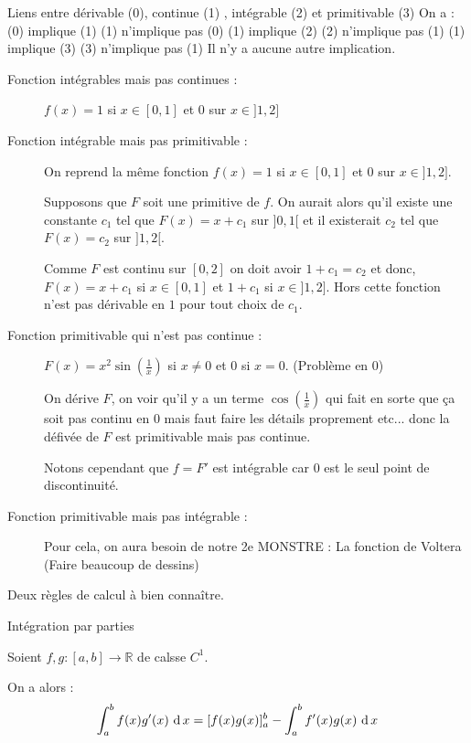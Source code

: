 Liens entre dérivable (0), continue (1) , intégrable (2) et primitivable (3)
On a :
(0) implique (1)
(1) n'implique pas (0)
(1) implique (2)
(2) n'implique pas (1)
(1) implique (3)
(3) n'implique pas (1)
Il n'y a aucune autre implication. 

\begin{description}
    \item[Fonction intégrables mais pas continues :] $f(x) = 1 $ si $x \in [0,1]$ et $0$ sur $x \in ]1,2]$
    
    \item [Fonction intégrable mais pas primitivable :] On reprend la même fonction $f(x)= 1 $ si $x \in [0,1]$ et $0$ sur $x \in ]1,2]$.

    Supposons que $F$ soit une primitive de $f$.
    On aurait alors qu'il existe une constante $c_1$ tel que $F(x) = x+ c_1$ sur $]0,1[$ et il existerait $c_2$ tel que $F(x) = c_2$ sur $]1,2[$.

    Comme $F$ est continu sur $[0,2]$ on doit avoir $1 + c_1 = c_2$ et donc, $F(x) = x+c_1$ si $x \in [0,1]$ et $1 + c_1$ si $x \in ]1,2]$. Hors cette fonction n'est pas dérivable en $1$ pour tout choix de $c_1$.

    \item [Fonction primitivable qui n'est pas continue :] $F(x) = x^2 \sin(\frac{1}{x})$ si $x \ne0$ et $0$ si $x = 0$. 
    (Problème en 0)

    On dérive $F$, on voir qu'il y a un terme $\cos(\frac{1}{x})$ qui fait en sorte que ça soit pas continu en $0$ mais faut faire les détails proprement etc... donc la défivée de $F$ est primitivable mais pas continue.

    Notons cependant que $f = F'$ est intégrable car $0$ est le seul point de discontinuité.

    \item[Fonction primitivable mais pas intégrable :]

    Pour cela, on aura besoin de notre 2e MONSTRE : La fonction de Voltera (Faire beaucoup de dessins)
\end{description}

Deux règles de calcul à bien connaître.

\begin{theoreme}{Intégration par parties}

    Soient $f,g : [a,b] \to \mathbb{R}$ de calsse $C^1$.

    On a alors :
    \begin{align*}
        \int_a^bf(x)g'(x)\,\operatorname{d} x = [f(x)g(x)]_a^b -\int_a^bf'(x)g(x)\,\operatorname{d} x 
    \end{align*}
\end{theoreme}

